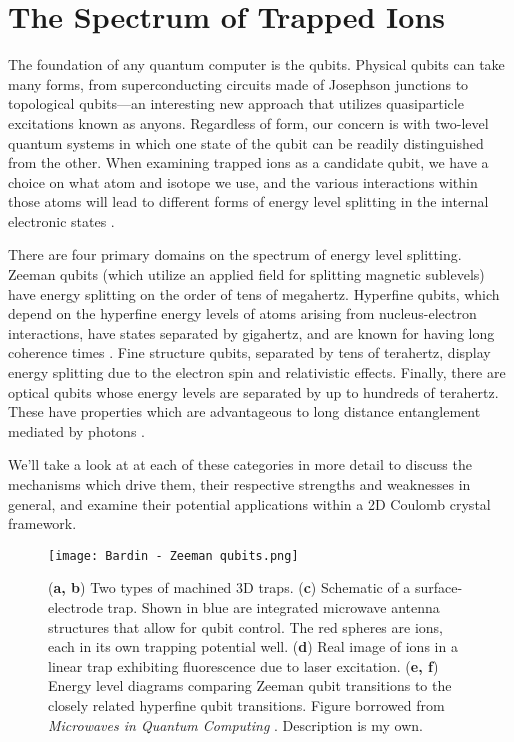 \section{The Spectrum of Trapped Ions}
The foundation of any quantum computer is the qubits. Physical qubits can take many forms, from superconducting circuits made of Josephson junctions to topological qubits---an interesting new approach that utilizes quasiparticle excitations known as anyons. Regardless of form, our concern is with two-level quantum systems in which one state of the qubit can be readily distinguished from the other. When examining trapped ions as a candidate qubit, we have a choice on what atom and isotope we use, and the various interactions within those atoms will lead to different forms of energy level splitting in the internal electronic states \cite{Bruzewicz}. 

There are four primary domains on the spectrum of energy level splitting. Zeeman qubits (which utilize an applied field for splitting magnetic sublevels) have energy splitting on the order of tens of megahertz. Hyperfine qubits, which depend on the hyperfine energy levels of atoms arising from nucleus-electron interactions, have states separated by gigahertz, and are known for having long coherence times \cite{Warring}. Fine structure qubits, separated by tens of terahertz, display energy splitting due to the electron spin and relativistic effects. Finally, there are optical qubits whose energy levels are separated by up to hundreds of terahertz. These have properties which are advantageous to long distance entanglement mediated by photons \cite{Dietrich}.

We'll take a look at at each of these categories in more detail to discuss the mechanisms which drive them, their respective strengths and weaknesses in general, and examine their potential applications within a 2D Coulomb crystal framework.

\begin{figure}[ht]
    \texttt{[image: Bardin - Zeeman qubits.png]}
    \caption{(\textbf{a, b}) Two types of machined 3D traps. (\textbf{c}) Schematic of a surface-electrode trap. Shown in blue are integrated microwave antenna structures that allow for qubit control. The red spheres are ions, each in its own trapping potential well. (\textbf{d}) Real image of ions in a linear trap exhibiting fluorescence due to laser excitation. (\textbf{e, f}) Energy level diagrams comparing Zeeman qubit transitions to the closely related hyperfine qubit transitions. Figure borrowed from \textit{Microwaves in Quantum Computing} \cite{Bardin}. Description is my own.}
    \label{fig:Zeeman qubit}
\end{figure}

